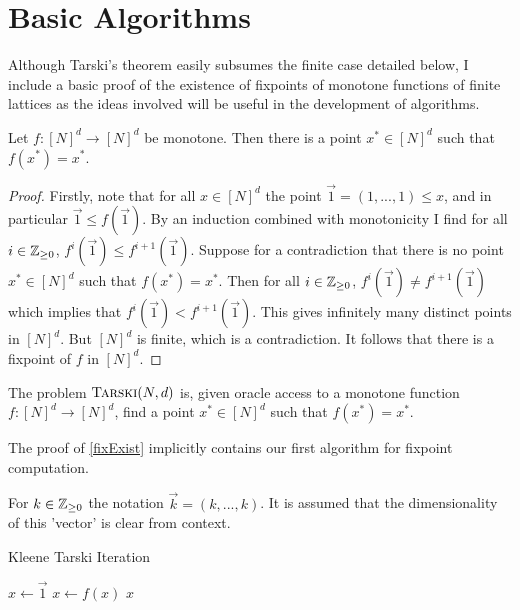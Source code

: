 \section{Basic Algorithms}
Although Tarski's theorem easily subsumes the finite case detailed below,
I include a basic proof of the existence of fixpoints of monotone functions of finite lattices
as the ideas involved will be useful in the development of algorithms.
\begin{theorem}\label{fixExist}
  Let $f : [N]^d \to [N]^d$ be monotone. Then there is a point $x^* \in [N]^d$ such that $f(x^*) = x^*$.
\end{theorem}
\begin{proof}
  Firstly, note that for all $x \in [N]^d$ the point $\vec{1} = (1, ..., 1) \leq x$, and in particular $\vec{1} \leq f(\vec{1})$.
  By an induction combined with monotonicity I find for all $i \in \mathbb{Z}_{\geq 0}$, $f^i (\vec{1}) \leq f^{i+1} (\vec{1})$. Suppose for a contradiction that there
  is no point $x^* \in [N]^d$ such that $f(x^*) = x^*$. Then for all $i \in \mathbb{Z}_{\geq 0}$, $f^i (\vec{1}) \neq f^{i+1}(\vec{1})$ which implies
  that $f^i (\vec{1}) < f^{i+1}(\vec{1})$. This gives infinitely many distinct points in $[N]^d$. But $[N]^d$ is finite, which is a contradiction.
  It follows that
  there is a fixpoint of $f$ in $[N]^d$.
\end{proof}
\begin{definition}[$\trsk$]
  The problem $\textsc{Tarski}(N, d)$ is, given oracle access to a monotone function $f : [N]^d \to [N]^d$, find a point $x^* \in [N]^d$ such that $f(x^*) = x^*$.
\end{definition}
The proof of \cref{fixExist} implicitly contains our first algorithm for fixpoint computation.
\begin{notation}
  For $k \in \mathbb{Z}_{\geq 0}$ the notation $\vec{k} = (k, ..., k)$. It is assumed that
  the dimensionality of this 'vector' is clear from context.
\end{notation}
\begin{algorithm}
  \caption{Kleene Tarski Iteration}
  \begin{algorithmic}[1]\label{kleeneTarski}
  \State $x \gets \vec{1}$
    \State $x \gets f(x)$
  \EndWhile
  \Return $x$
  \EndProcedure
  \end{algorithmic}
\end{algorithm}

